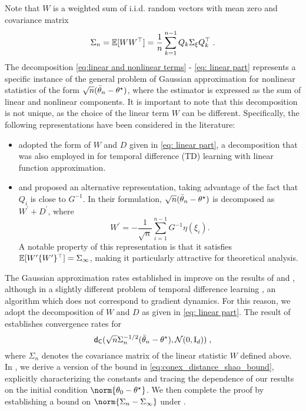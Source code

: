 Note that $W$ is a weighted sum of i.i.d. random vectors with mean zero and covariance matrix
\begin{equation}
\label{eq:sigma_n_def} 
\Sigma_n = \mathbb{E}[W W^\top] = \frac{1}{n} \sum_{k=1}^{n-1} Q_k \Sigma_\xi Q_k^\top \;.
\end{equation}
The decomposition \eqref{eq:linear and nonlinear terms} - \eqref{eq: linear part} represents a specific instance of the general problem of Gaussian approximation for nonlinear statistics of the form $\sqrt{n}(\bar\theta_n -\theta^\star)$, where the estimator is expressed as the sum of linear and nonlinear components. It is important to note that this decomposition is not unique, as the choice of the linear term \( W \) can be different. Specifically, the following representations have been considered in the literature:

\begin{itemize}[noitemsep, nolistsep]
    \item \cite{shao2022berry} adopted the form of \( W \) and \( D \) given in \eqref{eq: linear part}, a decomposition that was also employed in \cite{wu2024statistical} for temporal difference (TD) learning with linear function approximation.   
    \item \cite{samsonov2024gaussian} and \cite{srikant2024rates} proposed an alternative representation, taking advantage of the fact that \( Q_i \) is close to \( G^{-1} \). In their formulation, $\sqrt{n}(\bar{\theta}_n - \theta^\star)$ is decomposed as \( W^{\prime} + D^{\prime} \), where \begin{equation}
    W^{\prime} = - \frac{1}{\sqrt{n}}\sum_{i=1}^{n-1}G^{-1} \eta(\xi_i).
    \end{equation}
    A notable property of this representation is that it satisfies \( \mathbb{E}[W^{\prime}\{W^{\prime}\}^{\top}] = \Sigma_{\infty} \), making it particularly attractive for theoretical analysis.
\end{itemize}
The Gaussian approximation rates established in \cite{wu2024statistical} improve on the results of \cite{samsonov2024gaussian} and \cite{srikant2024rates}, although in a slightly different problem of temporal difference learning \cite{sutton:book:2018}, an algorithm which does not correspond to gradient dynamics. For this reason, we adopt the decomposition of \( W \) and \( D \) as given in \eqref{eq: linear part}. The result of \cite[Theorem 3.4]{shao2022berry} establishes convergence rates for  
\begin{equation}
\label{eq:conex_distance_shao_bound}
\mathsf{d}_{\mathsf{C}}(\sqrt{n}\Sigma_{n}^{-1/2}(\bar{\theta}_{n} - \theta^\star), \mathcal{N}(0,\mathrm{I}_{d}))\;,
\end{equation}
where \(\Sigma_n\) denotes the covariance matrix of the linear statistic \( W \) defined above.  
In , we derive a version of the bound in \eqref{eq:conex_distance_shao_bound}, explicitly characterizing the constants and tracing the dependence of our results on the initial condition \(\norm{\theta_0 - \thetas}\). We then complete the proof by establishing a bound on \(\norm{\Sigma_n - \Sigma_{\infty}}\) under .


